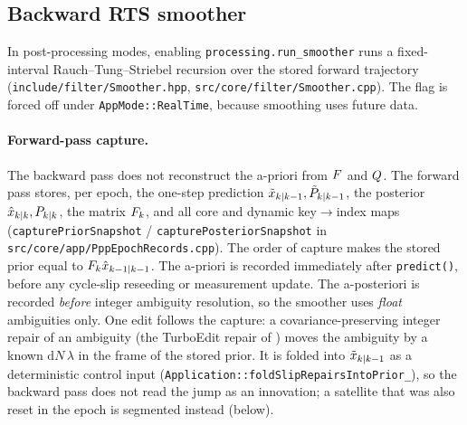 \documentclass[main.tex]{subfiles}
\begin{document}
\subsection{Backward RTS smoother}\label{sec:kf-smoother}

In post-processing modes, enabling \texttt{processing.run\_smoother}
runs a fixed-interval Rauch--Tung--Striebel recursion
\cite{rauch1965} over the stored forward trajectory
(\texttt{include/filter/Smoother.hpp},
\texttt{src/core/filter/Smoother.cpp}).  The flag is forced off under
\texttt{AppMode::RealTime}, because smoothing uses future data.

\paragraph{Forward-pass capture.}
The backward pass does not reconstruct the a-priori from $F$ and
$Q$.  The forward pass stores, per epoch, the one-step prediction
$\tilde{x}_{k|k-1}, \tilde{P}_{k|k-1}$, the posterior
$\hat{x}_{k|k}, P_{k|k}$, the matrix $F_k$, and all core and
dynamic key$\to$index maps (\texttt{capturePriorSnapshot} /
\texttt{capturePosteriorSnapshot} in
\texttt{src/core/app/PppEpochRecords.cpp}).  The order of capture makes the
stored prior equal to $F_k\hat{x}_{k-1|k-1}$.  The a-priori is
recorded immediately after \texttt{predict()}, before any cycle-slip
reseeding or measurement update.  The a-posteriori is recorded
\emph{before} integer ambiguity resolution, so the smoother uses
\emph{float} ambiguities only.  One edit follows the capture: a
covariance-preserving integer repair of an ambiguity (the TurboEdit repair of
) moves the ambiguity by a known
$\mathrm{d}N\,\lambda$ in the frame of the stored prior.  It is folded into
$\tilde{x}_{k|k-1}$ as a deterministic control input
(\texttt{Application::foldSlipRepairsIntoPrior\_}), so the backward pass does
not read the jump as an innovation; a satellite that was also reset in the
epoch is segmented instead (below).
\end{document}
